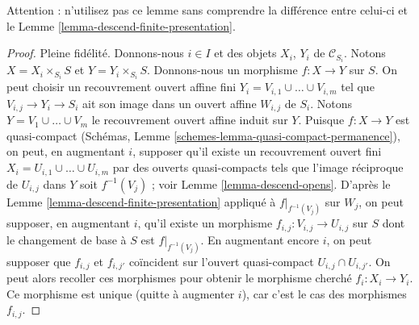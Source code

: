 \noindent
Attention : n'utilisez pas ce lemme sans comprendre la différence
entre celui-ci et le Lemme \ref{lemma-descend-finite-presentation}.

\begin{proof}
Pleine fidélité. Donnons-nous $i \in I$ et des objets
$X_i$, $Y_i$ de $\mathcal{C}_{S_i}$. Notons
$X = X_i \times_{S_i} S$ et $Y = Y_i \times_{S_i} S$.
Donnons-nous un morphisme $f : X \to Y$ sur $S$.
On peut choisir un recouvrement ouvert affine fini
$Y_i = V_{i, 1} \cup \ldots \cup V_{i, m}$
tel que $V_{i, j} \to Y_i \to S_i$ ait son image dans un
ouvert affine $W_{i, j}$ de $S_i$. Notons $Y = V_1 \cup \ldots \cup V_m$ le
recouvrement ouvert affine induit sur $Y$.
Puisque $f : X \to Y$ est quasi-compact
(Schémas, Lemme \ref{schemes-lemma-quasi-compact-permanence}),
on peut, en augmentant $i$, supposer qu'il existe un
recouvrement ouvert fini $X_i = U_{i, 1} \cup \ldots \cup U_{i, m}$
par des ouverts quasi-compacts tels que l'image réciproque de
$U_{i, j}$ dans $Y$ soit $f^{-1}(V_j)$ ; voir
Lemme \ref{lemma-descend-opens}.
D'après le Lemme \ref{lemma-descend-finite-presentation}
appliqué à $f|_{f^{-1}(V_j)}$ sur $W_j$, on peut supposer, en
augmentant $i$, qu'il existe un morphisme
$f_{i, j} : V_{i, j} \to U_{i, j}$ sur $S$ dont le changement de base
à $S$ est $f|_{f^{-1}(V_j)}$.
En augmentant encore $i$, on peut supposer que $f_{i, j}$ et $f_{i, j'}$
coïncident sur l'ouvert quasi-compact $U_{i, j} \cap U_{i, j'}$.
On peut alors recoller ces morphismes pour obtenir
le morphisme cherché $f_i : X_i \to Y_i$.
Ce morphisme est unique (quitte à augmenter $i$),
car c'est le cas des morphismes $f_{i, j}$.


\end{proof}
